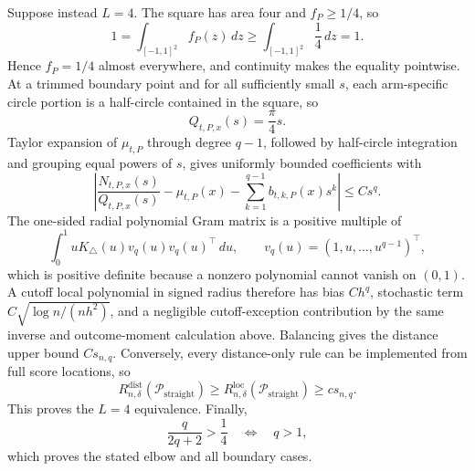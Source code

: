 Suppose instead \(L=4\).  The square has area four and \(f_P\geq1/4\), so
\[
1=\int_{[-1,1]^2}f_P(z)\,dz\geq\int_{[-1,1]^2}\frac14\,dz=1.
\]
Hence \(f_P=1/4\) almost everywhere, and continuity makes the equality pointwise.  At a trimmed boundary point and for all sufficiently small \(s\), each arm-specific circle portion is a half-circle contained in the square, so
\[
Q_{t,P,x}(s)=\frac\pi4s.
\]
Taylor expansion of \(\mu_{t,P}\) through degree \(q-1\), followed by half-circle integration and grouping equal powers of \(s\), gives uniformly bounded coefficients with
\[
\left|\frac{N_{t,P,x}(s)}{Q_{t,P,x}(s)}-\mu_{t,P}(x)
-\sum_{k=1}^{q-1}b_{t,k,P}(x)s^k\right|\leq Cs^q.
\]
The one-sided radial polynomial Gram matrix is a positive multiple of
\[
\int_0^1uK_\triangle(u)v_q(u)v_q(u)^\top\,du,
\qquad v_q(u)=(1,u,\ldots,u^{q-1})^\top,
\]
which is positive definite because a nonzero polynomial cannot vanish on \((0,1)\).  A cutoff local polynomial in signed radius therefore has bias \(Ch^q\), stochastic term \(C\sqrt{\log n/(nh^2)}\), and a negligible cutoff-exception contribution by the same inverse and outcome-moment calculation above.  Balancing gives the distance upper bound \(Cs_{n,q}\).  Conversely, every distance-only rule can be implemented from full score locations, so
\[
R_{n,\delta}^{\mathrm{dist}}(\mathcal P_{\mathrm{straight}})
\geq R_{n,\delta}^{\mathrm{loc}}(\mathcal P_{\mathrm{straight}})
\geq cs_{n,q}.
\]
This proves the \(L=4\) equivalence.  Finally,
\[
\frac{q}{2q+2}>\frac14\quad\Longleftrightarrow\quad q>1,
\]
which proves the stated elbow and all boundary cases.
